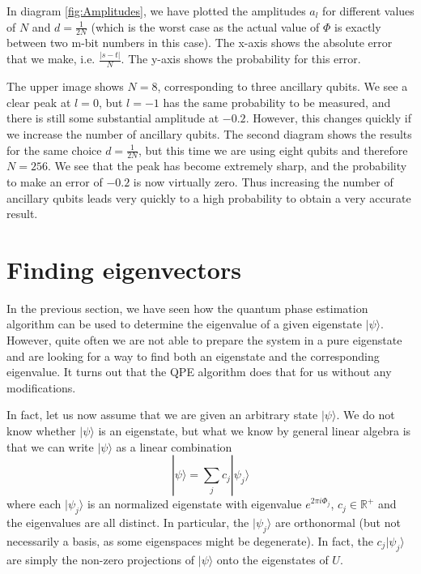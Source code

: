 \documentclass[a4paper, draft]{article}
\theoremstyle{own}
\theoremstyle{remark}
\newcommand{\R}{\mathbb{R}}
\begin{document}
In diagram \ref{fig:Amplitudes}, we have plotted the amplitudes $a_l$ for different values of $N$ and $d=\frac{1}{2N}$ (which is the worst case as the actual value of $\Phi$ is exactly between two m-bit numbers in this case). The x-axis shows the absolute error that we make, i.e. $\frac{|s-t|}{N}$. The y-axis shows the probability for this error. 

The upper image shows $N=8$, corresponding to three ancillary qubits. We see a clear peak at $l=0$, but $l=-1$ has the same probability to be measured, and there is still some substantial amplitude at  $-0.2$. However, this changes quickly if we increase the number of ancillary qubits. The second diagram shows the results for the same choice $d = \frac{1}{2N}$, but this time we are using eight qubits and therefore $N=256$. We see that the peak has become extremely sharp, and the probability to make an error of $-0.2$ is now virtually zero. Thus increasing the number of ancillary qubits leads very quickly to a high probability to obtain a very accurate result. 

\section{Finding eigenvectors}\label{sec:eigenvectors}

In the previous section, we have seen how the quantum phase estimation algorithm can be used to determine the eigenvalue of a given eigenstate $|\psi \rangle$. However, quite often we are not able to prepare the system in a pure eigenstate and are looking for a way to find both an eigenstate and the corresponding eigenvalue. It turns out that the QPE algorithm does that for us without any modifications.

In fact, let us now assume that we are given an arbitrary state $|\psi \rangle$. We do not know whether $|\psi \rangle$ is an eigenstate, but what we know by general linear algebra is that we can write $|\psi \rangle$ as a linear combination
$$
|\psi \rangle = \sum_j c_j |\psi_j \rangle
$$
where each $|\psi_j \rangle$ is an normalized eigenstate with eigenvalue $e^{2\pi i \Phi_j}$, $c_j \in \R^+$ and the eigenvalues are all distinct. In particular, the $|\psi_j \rangle$ are orthonormal (but not necessarily a basis, as some eigenspaces might be degenerate). In fact, the $c_j |\psi_j \rangle$ are simply the non-zero projections of $|\psi \rangle$ onto the eigenstates of $U$.
\end{document}
